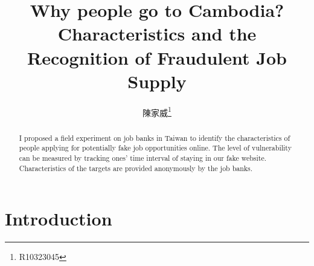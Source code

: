\documentclass[11pt, a4paper]{article}
\title{Why people go to Cambodia? Characteristics and the Recognition of Fraudulent Job Supply}
\author{陳家威\thanks{R10323045}}
\begin{document}
    \maketitle
    \begin{abstract}
        I proposed a field experiment on job banks in Taiwan to identify the characteristics of people applying for potentially fake 
        job opportunities online. The level of vulnerability can be measured by tracking ones' time interval of staying in our fake website. 
        Characteristics of the targets are provided anonymously by the job banks.
    \end{abstract}

    \section{Introduction}
    
\end{document}
